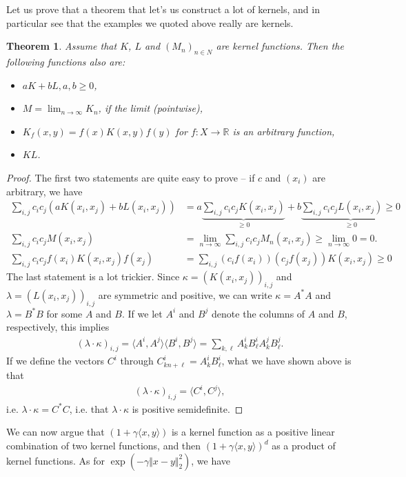 \documentclass{article}
\newcommand{\sprod}[1]{\langle #1 \rangle}
\newcommand{\R}{\mathbb{R}}
\newtheorem{theorem}{Theorem}
\newcommand{\norm}[1]{\Vert #1 \Vert}
\begin{document}
Let us prove that a theorem that let's us construct a lot of kernels, and in particular see that the examples we quoted above really are kernels.
\begin{theorem}
    Assume that $K$, $L$ and $(M_n)_{n\in N}$ are kernel functions. Then the following functions also are:
    \begin{itemize}
        \item $aK + bL, a,b\geq 0$,
        \item $M=\lim_{n\to \infty}K_n$, if the limit (pointwise),
        \item $K_f(x,y)=f(x)K(x,y)f(y)$ for $f : X\to \R$ is an arbitrary function,
        \item $KL$.
    \end{itemize}
\end{theorem}
\begin{proof}
    The first two statements are quite easy to prove -- if $c$ and $(x_i)$ are arbitrary, we have
    \begin{align*}
        \sum_{i,j} c_ic_j (aK(x_i,x_j)+bL(x_i,x_j)) &=  a\underbrace{\sum_{i,j} c_ic_j K(x_i,x_j)}_{\geq 0}+b\underbrace{\sum_{i,j} c_ic_j L (x_i,x_j) \geq 0}_{\geq 0} \\
         \sum_{i,j} c_ic_j M(x_i,x_j) &= \lim_{n\to \infty }  \sum_{i,j} c_ic_j M_n(x_i,x_j) \geq \lim_{n\to \infty} 0 = 0. \\
         \sum_{i,j} c_ic_j f(x_i)K(x_i,x_j)f(x_j) &= \sum_{i,j}(c_if(x_i))(c_jf(x_j))K(x_i,x_j) \geq 0 
    \end{align*}
    The last statement is a lot trickier. Since $\kappa =(K(x_i,x_j))_{i,j}$ and $\lambda =(L(x_i,x_j))_{i,j}$ are symmetric and positive, we can write $\kappa = A^*A$ and $\lambda = B^*B$ for some $A$ and $B$. If we let $A^i$ and $B^j$ denote the columns of $A$ and $B$, respectively, this implies
    \begin{align*}
        (\lambda \cdot \kappa)_{i,j} = \sprod{A^i,A^j}\sprod{B^i,B^j} =  \sum_{k,\ell} A^i_kB^i_\ell A^j_kB^j_\ell.
    \end{align*}
    If we define the vectors $C^i$ through $C^i_{kn+\ell}=A^i_kB^i_\ell$, what we have shown above is that 
    \begin{align*}
        (\lambda \cdot \kappa)_{i,j} = \sprod{C^i,C^j},
    \end{align*}
    i.e. $\lambda \cdot \kappa = C^*C$, i.e. that $\lambda \cdot \kappa$ is positive semidefinite.
\end{proof}
We can now argue that $(1+\gamma\sprod{x,y})$ is a kernel function as a positive linear combination of two kernel functions, and then $(1+\gamma\sprod{x,y})^d$ as a product of kernel functions. As for $\exp(-\gamma \norm{x-y}_2^2)$, we have
\end{document}
